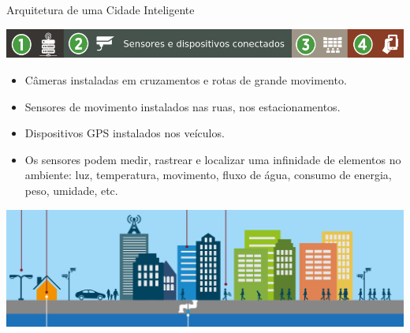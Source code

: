 \documentclass{beamer}
\begin{document}
\begin{frame}{Arquitetura de uma Cidade Inteligente}
\begin{center}
\includegraphics[width=1\textwidth]{img/arquitetura-menu-2.png}  
\end{center}
\begin{exampleblock}{}

\begin{itemize}

 \item Câmeras instaladas em cruzamentos e rotas de grande movimento.
 \item Sensores de movimento instalados nas ruas, nos estacionamentos.
 \item Dispositivos GPS instalados nos veículos.
 \item Os sensores podem medir, rastrear e localizar uma infinidade de elementos no ambiente: luz, temperatura, movimento, fluxo de água, consumo de energia, peso, umidade, etc.

 \end{itemize}

\end{exampleblock}
\begin{center}
\includegraphics[width=.8\textwidth]{img/sensor_1.png}  
\end{center}


\end{frame}
\end{document}
